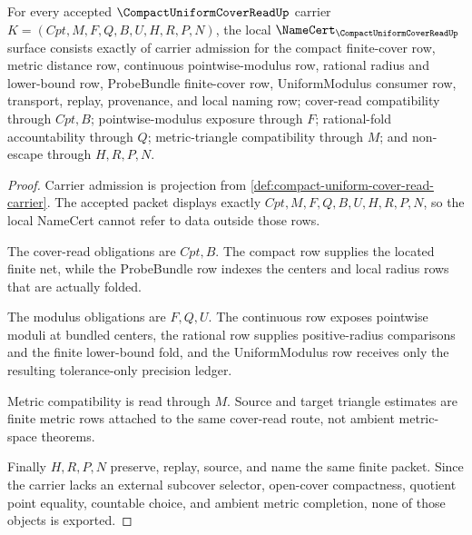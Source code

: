 \begin{theorem}
\label{thm:compact-uniform-cover-read-namecert-obligations}
For every accepted $\CompactUniformCoverReadUp$ carrier $K=(Cpt,M,F,Q,B,U,H,R,P,N)$, the local $\NameCert_{\CompactUniformCoverReadUp}$ surface consists exactly of carrier admission for the compact finite-cover row, metric distance row, continuous pointwise-modulus row, rational radius and lower-bound row, ProbeBundle finite-cover row, UniformModulus consumer row, transport, replay, provenance, and local naming row; cover-read compatibility through $Cpt,B$; pointwise-modulus exposure through $F$; rational-fold accountability through $Q$; metric-triangle compatibility through $M$; and non-escape through $H,R,P,N$.
\end{theorem}
\begin{proof}
Carrier admission is projection from \autoref{def:compact-uniform-cover-read-carrier}. The accepted packet displays exactly $Cpt,M,F,Q,B,U,H,R,P,N$, so the local NameCert cannot refer to data outside those rows.

The cover-read obligations are $Cpt,B$. The compact row supplies the located finite net, while the ProbeBundle row indexes the centers and local radius rows that are actually folded.

The modulus obligations are $F,Q,U$. The continuous row exposes pointwise moduli at bundled centers, the rational row supplies positive-radius comparisons and the finite lower-bound fold, and the UniformModulus row receives only the resulting tolerance-only precision ledger.

Metric compatibility is read through $M$. Source and target triangle estimates are finite metric rows attached to the same cover-read route, not ambient metric-space theorems.

Finally $H,R,P,N$ preserve, replay, source, and name the same finite packet. Since the carrier lacks an external subcover selector, open-cover compactness, quotient point equality, countable choice, and ambient metric completion, none of those objects is exported.
\end{proof}

